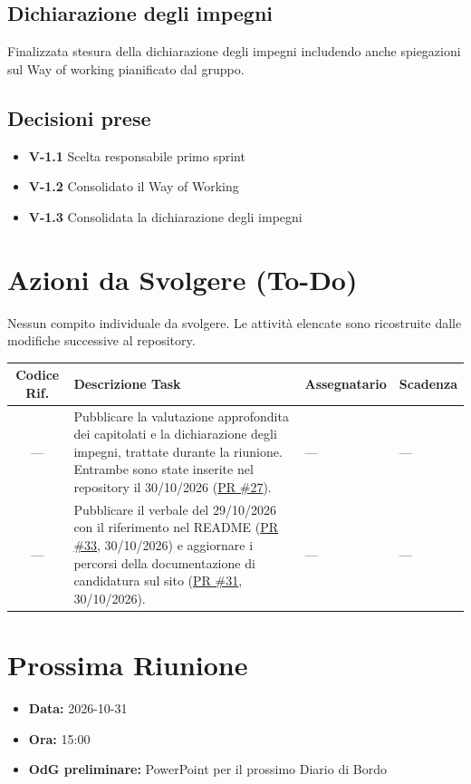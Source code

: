 \documentclass[a4paper, 11pt]{article}
\begin{document}
\subsection{Dichiarazione degli impegni}
Finalizzata stesura della dichiarazione degli impegni includendo anche spiegazioni sul Way of working pianificato dal gruppo.



\subsection{Decisioni prese}
\begin{itemize}
    \item \textbf{V-1.1} Scelta responsabile primo sprint
    \item \textbf{V-1.2} Consolidato il Way of Working
    \item \textbf{V-1.3} Consolidata la dichiarazione degli impegni
\end{itemize}

\section{Azioni da Svolgere (To-Do)}
Nessun compito individuale da svolgere. Le attività elencate sono ricostruite dalle modifiche successive al repository.

\begin{tabularx}{\textwidth}{|c|X|l|l|}
\hline
\textbf{Codice Rif.} & \textbf{Descrizione Task} & \textbf{Assegnatario} & \textbf{Scadenza} \\ \hline
--- & Pubblicare la valutazione approfondita dei capitolati e la dichiarazione degli impegni, trattate durante la riunione. Entrambe sono state inserite nel repository il 30/10/2026 (\href{https://github.com/BitCrusher-Team/Progetto_SWE_26-27/pull/27}{PR \#27}). & --- & --- \\ \hline
--- & Pubblicare il verbale del 29/10/2026 con il riferimento nel README (\href{https://github.com/BitCrusher-Team/Progetto_SWE_26-27/pull/33}{PR \#33}, 30/10/2026) e aggiornare i percorsi della documentazione di candidatura sul sito (\href{https://github.com/BitCrusher-Team/Progetto_SWE_26-27/pull/31}{PR \#31}, 30/10/2026). & --- & --- \\ \hline

\end{tabularx}

\section{Prossima Riunione}
\begin{itemize}
    \item \textbf{Data:} 2026-10-31
    \item \textbf{Ora:} 15:00
    \item \textbf{OdG preliminare:} PowerPoint per il prossimo Diario di Bordo
\end{itemize}
\end{document}
